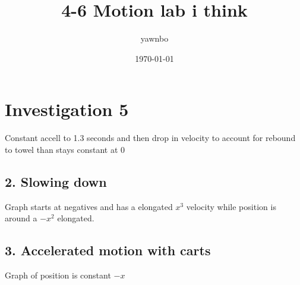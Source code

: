 \documentclass[a4paper]{article}
\title{4-6 Motion lab i think}
\author{yawnbo}
\date{\today}
\begin{document}
\maketitle
\section*{Investigation 5}%
\label{sec:Investigation 5}
Constant accell to 1.3 seconds and then drop in velocity to account for rebound to towel than stays constant at 0

\subsection*{2. Slowing down}%
\label{sub:2. Slowing down}
Graph starts at negatives and has a elongated $ x^3 $ velocity while position is around a $ -x^2 $ elongated. 

\subsection*{3. Accelerated motion with carts}%
\label{sub:3. Accelerated motion with carts}
Graph of position is constant $ -x $ 
\end{document}
